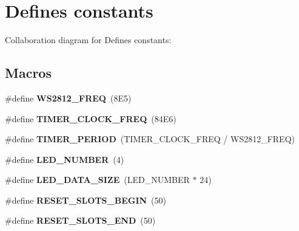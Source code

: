 \hypertarget{group___w_s2812}{}\section{Defines constants}
\label{group___w_s2812}
Collaboration diagram for Defines constants\+:
\subsection*{Macros}
\begin{DoxyCompactItemize}
\item 
\mbox{\label{group___w_s2812_ga857df980c46f31dbe009560d826413a8}} 
\#define {\bfseries W\+S2812\+\_\+\+F\+R\+EQ}~(8\+E5)
\item 
\mbox{\label{group___w_s2812_ga5f1fac9f0aaabad0683c04e44a1aefe9}} 
\#define {\bfseries T\+I\+M\+E\+R\+\_\+\+C\+L\+O\+C\+K\+\_\+\+F\+R\+EQ}~(84\+E6)
\item 
\mbox{\label{group___w_s2812_gad888acf7c13a4bedd6541ceb5cf9bf6d}} 
\#define {\bfseries T\+I\+M\+E\+R\+\_\+\+P\+E\+R\+I\+OD}~(T\+I\+M\+E\+R\+\_\+\+C\+L\+O\+C\+K\+\_\+\+F\+R\+EQ / W\+S2812\+\_\+\+F\+R\+EQ)
\item 
\mbox{\label{group___w_s2812_ga306db1a2fccc9c26ad114b50a88940d3}} 
\#define {\bfseries L\+E\+D\+\_\+\+N\+U\+M\+B\+ER}~(4)
\item 
\mbox{\label{group___w_s2812_ga7af472c9efcf021651c589bb54d103fa}} 
\#define {\bfseries L\+E\+D\+\_\+\+D\+A\+T\+A\+\_\+\+S\+I\+ZE}~(L\+E\+D\+\_\+\+N\+U\+M\+B\+ER $\ast$ 24)
\item 
\mbox{\label{group___w_s2812_ga38b56d14857b32e86b876a32957a2b63}} 
\#define {\bfseries R\+E\+S\+E\+T\+\_\+\+S\+L\+O\+T\+S\+\_\+\+B\+E\+G\+IN}~(50)
\item 
\mbox{\label{group___w_s2812_ga91e46b7f75ff75a4719a9d7f589df5a3}} 
\#define {\bfseries R\+E\+S\+E\+T\+\_\+\+S\+L\+O\+T\+S\+\_\+\+E\+ND}~(50)
\item 
\mbox{\label{group___w_s2812_gacbccf04b27120fd8ba0a8eae7866291f}} 

\end{DoxyCompactItemize}
